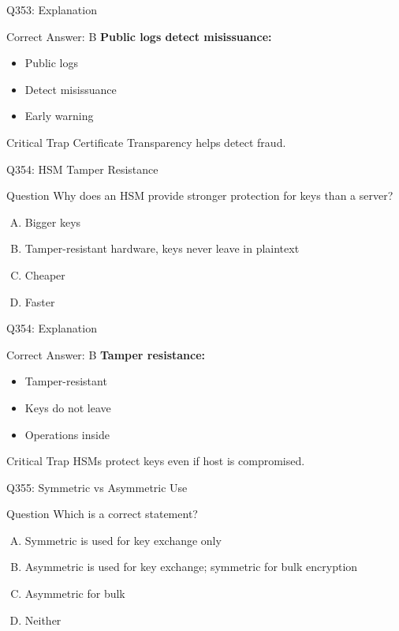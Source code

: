 \documentclass{beamer}
\begin{document}
	\begin{frame}{Q353: Explanation}
		\begin{block}{Correct Answer: B}
			\textbf{Public logs detect misissuance:}
			\begin{itemize}
				\item Public logs
				\item Detect misissuance
				\item Early warning
			\end{itemize}
		\end{block}
		\begin{alertblock}{Critical Trap}
			Certificate Transparency helps detect fraud.
		\end{alertblock}
	\end{frame}
	
	\begin{frame}{Q354: HSM Tamper Resistance}
		\begin{block}{Question}
			Why does an HSM provide stronger protection for keys than a server?
		\end{block}
		\begin{enumerate}[(A)]
			\item Bigger keys
			\item Tamper-resistant hardware, keys never leave in plaintext
			\item Cheaper
			\item Faster
		\end{enumerate}
	\end{frame}
	
	\begin{frame}{Q354: Explanation}
		\begin{block}{Correct Answer: B}
			\textbf{Tamper resistance:}
			\begin{itemize}
				\item Tamper-resistant
				\item Keys do not leave
				\item Operations inside
			\end{itemize}
		\end{block}
		\begin{alertblock}{Critical Trap}
			HSMs protect keys even if host is compromised.
		\end{alertblock}
	\end{frame}
	
	\begin{frame}{Q355: Symmetric vs Asymmetric Use}
		\begin{block}{Question}
			Which is a correct statement?
		\end{block}
		\begin{enumerate}[(A)]
			\item Symmetric is used for key exchange only
			\item Asymmetric is used for key exchange; symmetric for bulk encryption
			\item Asymmetric for bulk
			\item Neither
		\end{enumerate}
	\end{frame}
	
\end{document}
